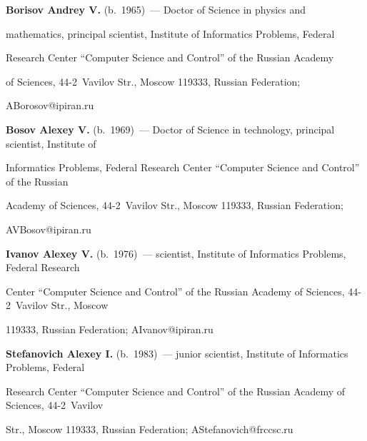 \noindent


\textbf{Borisov Andrey V.} (b.\ 1965)~--- Doctor of Science in physics and 


mathematics, principal scientist, Institute of Informatics Problems, Federal 


Research Center ``Computer Science and Control'' of the Russian Academy 


of Sciences, 44-2~Vavilov Str., Moscow 119333, Russian Federation; 


\mbox{ABorosov@ipiran.ru}





\vspace*{2pt}





\noindent


\textbf{Bosov Alexey V.} (b.\ 1969)~--- Doctor of Science in technology, principal scientist, Institute of 


Informatics Problems, Federal Research Center ``Computer Science and Control'' of the Russian 


Academy of Sciences, 44-2~Vavilov Str., Moscow 119333, Russian Federation; 


\mbox{AVBosov@ipiran.ru}





\vspace*{2pt}





\noindent


\textbf{Ivanov Alexey V.} (b.\ 1976)~--- scientist, Institute of Informatics Problems, Federal Research 


Center ``Computer Science and Control'' of the Russian Academy of Sciences, 44-2~Vavilov Str., Moscow 


119333, Russian Federation; \mbox{AIvanov@ipiran.ru}





\vspace*{2pt}





\noindent


\textbf{Stefanovich Alexey I.} (b.\ 1983)~--- junior scientist, Institute of Informatics Problems, Federal 


Research Center ``Computer Science and Control'' of the Russian Academy of Sciences, 44-2~Vavilov 


Str., Moscow 119333, Russian Federation; \mbox{AStefanovich@frccsc.ru}


\label{end\stat}








\renewcommand{\bibname}{\protect\rm Литература}


